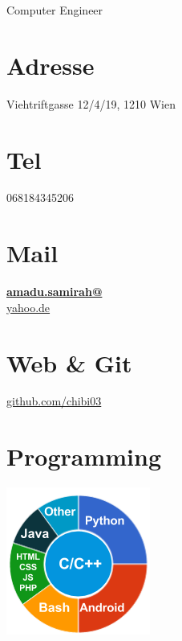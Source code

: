 \documentclass[]{friggeri-cv}
\begin{document}
      {Computer Engineer}
      

\begin{aside}
  \section{Adresse}
   	Viehtriftgasse 12/4/19, 1210 Wien
  \section{Tel}
    068184345206
  \section{Mail}
  	 \href{mailto:amadu.samiah@yahoo.de}{\textbf{amadu.samirah@}\\yahoo.de}
    ~
  \section{Web \& Git}
    \href{https://github.com/chibi03}{github.com/chibi03}
    ~
  \section{Programming}
    \includegraphics[scale=0.62]{img/programming.png}
    ~
\end{aside}
\end{document}

